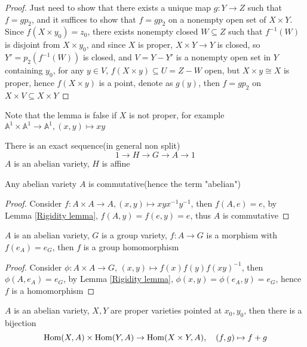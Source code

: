 \begin{proof}
Just need to show that there exists a unique map $g:Y\to Z$ such that $f=gp_2$, and it suffices to show that $f=gp_2$ on a nonempty open set of $X\times Y$. Since $f(X\times y_0)=z_0$, there exists nonempty closed $W\subseteq Z$ such that $f^{-1}(W)$ is disjoint from $X\times y_0$, and since $X$ is proper, $X\times Y\to Y$ is closed, so $Y'=p_2(f^{-1}(W))$ is closed, and $V=Y-Y'$ is a nonempty open set in $Y$ containing $y_0$, for any $y\in V$, $f(X\times y)\subseteq U=Z-W$ open, but $X\times y\cong X$ is proper, hence $f(X\times y)$ is a point, denote as $g(y)$, then $f=gp_2$ on $X\times V\subseteq X\times Y$
\end{proof}

\begin{remark}
Note that the lemma is false if $X$ is not proper, for example $\mathbb A^1\times\mathbb A^1\to\mathbb A^1,(x,y)\mapsto xy$
\end{remark}

\begin{theorem}[Chevalley]
There is an exact sequence(in general non split)
\[1\to H\to G\to A\to 1\]
$A$ is an abelian variety, $H$ is affine
\end{theorem}

\begin{theorem}
Any abelian variety $A$ is commutative(hence the term "abelian")
\end{theorem}

\begin{proof}
Consider $f:A\times A\to A,(x,y)\mapsto xyx^{-1}y^{-1}$, then $f(A,e)=e$, by Lemma \ref{Rigidity lemma}, $f(A,y)=f(e,y)=e$, thus $A$ is commutative
\end{proof}

\begin{corollary}
$A$ is an abelian variety, $G$ is a group variety, $f:A\to G$ is a morphism with $f(e_A)=e_G$, then $f$ is a group homomorphism
\end{corollary}

\begin{proof}
Consider $\phi:A\times A\to G$, $(x,y)\mapsto f(x)f(y)f(xy)^{-1}$, then $\phi(A,e_A)=e_G$, by Lemma \ref{Rigidity lemma}, $\phi(x,y)=\phi(e_A,y)=e_G$, hence $f$ is a homomorphism
\end{proof}

\begin{corollary}
$A$ is an abelian variety, $X,Y$ are proper varieties pointed at $x_0,y_0$, then there is a bijection
\[\operatorname{Hom}(X,A)\times \operatorname{Hom}(Y,A)\to\operatorname{Hom}(X\times Y,A),\quad (f,g)\mapsto f+g\]
\end{corollary}

